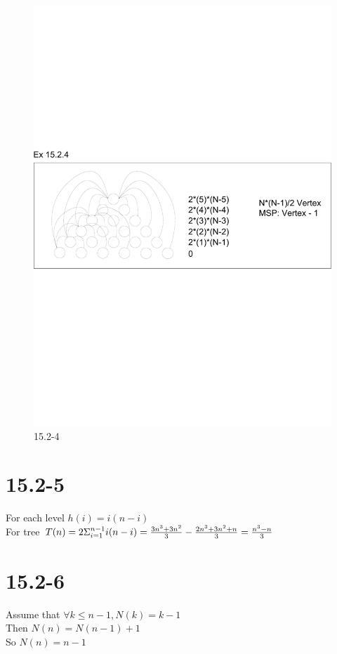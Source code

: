 \documentclass[]{article}
\begin{document}
\begin{figure}
	\centering
	\includegraphics[width=0.8\linewidth]{1524}
	\caption{15.2-4}
	\label{fig:15.2-4}
\end{figure}

\section{15.2-5}
For each level $h(i) = i (n-i)$\\
For tree $T(n) = 2\Sigma_{i = 1}^{n-1}i(n-i)
\\ = \frac{3n^3 + 3n^2}{3} - \frac{2n^3 + 3n^2 +n}{3}
\\ = \frac{n^3 - n }{3}$

\section{15.2-6}
Assume that $\forall k \le n-1, N(k) = k-1$\\
Then $N(n) = N(n-1) + 1$\\
So $N(n) = n-1$
\end{document}
